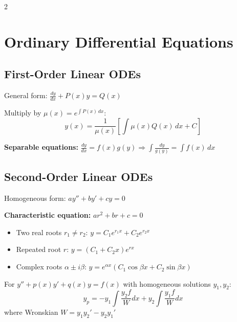 \documentclass[10pt,a4paper]{article}
\begin{document}
\small

\begin{multicols}{2}

\section{Ordinary Differential Equations}

\subsection{First-Order Linear ODEs}
General form: $\displaystyle \frac{dy}{dx} + P(x)y = Q(x)$

\begin{keyformula}
Multiply by $\mu(x) = e^{\int P(x)\,dx}$:
\begin{equation}
y(x) = \frac{1}{\mu(x)}\left[\int \mu(x)Q(x)\,dx + C\right]
\end{equation}
\end{keyformula}

\textbf{Separable equations:} $\displaystyle\frac{dy}{dx} = f(x)g(y) \Rightarrow \int\frac{dy}{g(y)} = \int f(x)\,dx$

\subsection{Second-Order Linear ODEs}
Homogeneous form: $a y'' + b y' + c y = 0$

\textbf{Characteristic equation:} $ar^2 + br + c = 0$
\begin{itemize}
    \item Two real roots $r_1 \neq r_2$: $y = C_1 e^{r_1 x} + C_2 e^{r_2 x}$
    \item Repeated root $r$: $y = (C_1 + C_2 x)e^{rx}$
    \item Complex roots $\alpha \pm i\beta$: $y = e^{\alpha x}(C_1\cos\beta x + C_2\sin\beta x)$
\end{itemize}

\begin{keyformula}
For $y'' + p(x)y' + q(x)y = f(x)$ with homogeneous solutions $y_1, y_2$:
\begin{equation}
y_p = -y_1\int\frac{y_2 f}{W}dx + y_2\int\frac{y_1 f}{W}dx
\end{equation}
where Wronskian $W = y_1 y_2' - y_2 y_1'$
\end{keyformula}


\end{multicols}
\end{document}
